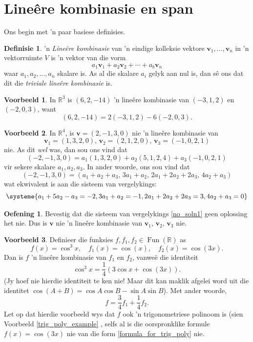 \documentclass[a4paper,11pt]{book}
\theoremstyle{definition}
\newtheorem{definition}[theorem]{Definisie}
\newtheorem{exercise}{Oefening}
\newtheorem{example_environment}{Voorbeeld}[chapter]
\newcommand{\be}{\begin{equation}}
\newcommand{\ee}{\end{equation}}
\newcommand{\ve}[1]{\mathbf{#1}}
\newenvironment{example}
	{
		\begin{oframed}
		\begin{example_environment}
	}
	{
		\end{example_environment}
		\end{oframed}
	}
\DeclareMathOperator{\Fun}{Fun}
\begin{document}
\section{Line\^{e}re kombinasie en span} \label{ACh2Sec1DefFinDimVectorSpaces}
Ons begin met 'n paar basiese definisies.
\begin{definition} 'n \emph{Line{\^e}re kombinasie} van 'n eindige
	kolleksie vektore $\ve{v}_1, \ldots, \ve{v}_n$ in 'n vektorruimte $V$
	is 'n vektor van die vorm
	\be
		a_1 \ve{v}_1 + a_2 \ve{v}_2 + \cdots + a_b \ve{v}_n
	\ee
	waar $a_1, a_2, \ldots, a_n$ skalare is. As al die skalare $a_i$ gelyk
	aan nul is, dan s{\^e} ons dat dit die \emph{triviale line{\^e}re
	kombinasie} is.	
\end{definition}
\begin{example} In $\mathbb{R}^3$ is $(6, 2, -14)$ 'n line{\^e}re
	kombinasie van $(-3, 1, 2)$ en $(-2, 0, 3)$, want
	\[
		(6, 2, -14) = 2 (-3, 1, 2) -6 (-2, 0, 3).
	\]
\end{example}
\begin{example} In $\mathbb{R}^4$, is $\ve{v} = (2, -1, 3, 0)$ nie 'n line{\^e}re
	kombinasie van 
	\[
	\ve{v}_1=(1, 3, 2, 0), \, \ve{v}_2=(2, 1, 2, 0), \, \ve{v}_3=(-1, 0, 2, 1)
	\]
	 nie.
	As dit \emph{wel} was, dan sou ons vind dat
	\[
		(-2, -1, 3, 0) = a_1 (1, 3, 2, 0) + a_2 (5, 1, 2, 4) + a_3 (-1, 0,
		2, 1)
	\]
	vir sekere skalare $a_1, a_2, a_3$. In ander woorde, ons sou vind dat
	\[
		(-2, -1, 3, 0) = (a_1 + a_2 + a_3, \, 3a_1 + a_2, \, 2a_1 + 2a_2 +
		2a_3, \, 4a_2 + a_3)
	\]
	wat ekwivalent is aan die sisteem van vergelykings:
	\be \label{no_soln1}
	\systeme{a_1 + 5a_2 -a_3 = -2, 3a_1 + a_2 = -1, 2a_1 + 2a_2 + 2a_3 = 3,
	4a_2 + a_3 = 0}
	\ee
		\begin{exercise} Bevestig dat die sisteem van vergelykings
		\eqref{no_soln1} geen oplossing het nie. Dus is $\ve{v}$ nie 'n line\^{e}re kombinasie van $\ve{v}_1$, $\ve{v}_2$, $\ve{v}_3$ nie. 
	\end{exercise}

\end{example}

\begin{example} Definieer die funksies $f, f_1, f_2 \in
	\Fun(\mathbb{R})$ as
	\[
		f(x) = \cos^3 x, \quad f_1 (x) = \cos (x), \quad f_2
		(x) = \cos (3x).
	\]
	Dan is  $f$ 'n line{\^e}re kombinasie van $f_1$ en
	$f_2$, vanwe{\"e} die identiteit
	\[
	 \cos^3 x = \frac{1}{4} (3 \cos x	+ \cos(3x)).
	 \]
(Jy hoef nie hierdie identiteit te ken nie! Maar dit kan maklik afgelei word uit die identitet $\cos(A+B) = \cos A \cos B - \sin A \sin B$). Met ander woorde,
	\[
		f = \frac{3}{4} f_1 + \frac{1}{4} f_2 .
	\]
	Let op dat hierdie voorbeeld wys dat $f$ ook 'n trigonometriese polinoom
	is (sien Voorbeeld \ref{trig_poly_example} , selfs al is die oorspronklike formule $f(x) = \cos(3x)$ nie van
	die form \eqref{formula_for_trig_poly} nie.
\end{example}
\end{document}
